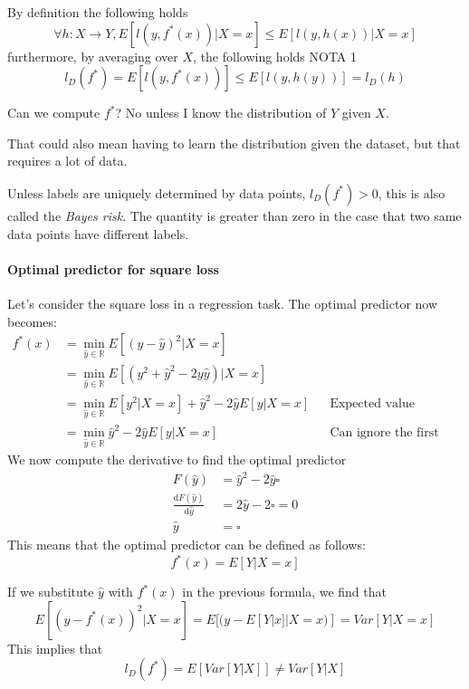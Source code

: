 By definition the following holds
$$\forall h : X \rightarrow Y, E[l(y, f^*(x))|X = x] \leq E[l(y, h(x))|X = x]$$
furthermore, by averaging over $X$, the following holds NOTA 1
$$l_D(f^*) = E[l(y,f^*(x))] \leq E[l(y,h(y))] = l_D(h)$$

Can we compute $f^*$? No unless I know the distribution of $Y$ given $X$. 
\begin{remark}
    That could also mean having to learn the distribution given the dataset, 
    but that requires a lot of data.
\end{remark}
Unless labels are uniquely determined by data points, $l_D(f^*) > 0$, this is also called the 
\emph{Bayes risk}.
The quantity is greater than zero in the case that two same data points have different labels.

\paragraph{Optimal predictor for square loss}
Let's consider the square loss in a regression task.
The optimal predictor now becomes: 
\begin{equation}
    \begin{aligned}
        f^*(x) &= \min_{\hat{y} \in \mathbb{R}} E[(y - \hat{y})^2 | X = x]\\
        &= \min_{\hat{y} \in \mathbb{R}} E[(y^2 + \hat{y}^2 - 2y\hat{y}) | X = x]\\
        &= \min_{\hat{y} \in \mathbb{R}} E[y^2| X = x] + \hat{y}^2 - 2\hat{y}E[y | X = x] && \text{Expected value linearity}\\
        &= \min_{\hat{y} \in \mathbb{R}} \hat{y}^2 - 2\hat{y}E[y | X = x] && \text{Can ignore the first}
    \end{aligned}
\end{equation}
We now compute the derivative to find the optimal predictor
\begin{equation}
    \begin{aligned}
        F(\hat{y}) &= \hat{y}^2 - 2\hat{y}\square\\
        \frac{\mathrm{d}F(\hat{y})}{\mathrm{d}\hat{y}} &= 2\hat{y} - 2\square = 0\\
        \hat{y} &= \square
    \end{aligned}
\end{equation}
This means that the optimal predictor can be defined as follows:
$$f^*(x) = E[Y | X = x]$$

If we substitute $\hat{y}$ with $f^*(x)$ in the previous formula, we find that
$$E[(y - f^*(x))^2|X=x] = E[(y - E[Y | x] | X = x)] = \mathit{Var}[Y | X = x]$$
This implies that 
$$l_D(f^*) = E[\mathit{Var}[Y | X]] \neq \mathit{Var}[Y | X]$$

